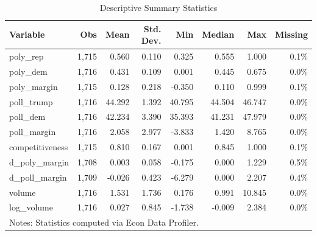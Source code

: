 \begin{table}[htbp]
\centering
\caption{Descriptive Summary Statistics}
\label{tab:summary_stats}
\begin{tabular}{lrrrrrrr}
\hline\hline
Variable & Obs & Mean & Std. Dev. & Min & Median & Max & Missing \\
\hline
poly\_rep & 1,715 & 0.560 & 0.110 & 0.325 & 0.555 & 1.000 & 0.1\% \\
poly\_dem & 1,716 & 0.431 & 0.109 & 0.001 & 0.445 & 0.675 & 0.0\% \\
poly\_margin & 1,715 & 0.128 & 0.218 & -0.350 & 0.110 & 0.999 & 0.1\% \\
poll\_trump & 1,716 & 44.292 & 1.392 & 40.795 & 44.504 & 46.747 & 0.0\% \\
poll\_dem & 1,716 & 42.234 & 3.390 & 35.393 & 41.231 & 47.979 & 0.0\% \\
poll\_margin & 1,716 & 2.058 & 2.977 & -3.833 & 1.420 & 8.765 & 0.0\% \\
competitiveness & 1,715 & 0.810 & 0.167 & 0.001 & 0.845 & 1.000 & 0.1\% \\
d\_poly\_margin & 1,708 & 0.003 & 0.058 & -0.175 & 0.000 & 1.229 & 0.5\% \\
d\_poll\_margin & 1,709 & -0.026 & 0.423 & -6.279 & 0.000 & 2.207 & 0.4\% \\
volume & 1,716 & 1.531 & 1.736 & 0.176 & 0.991 & 10.845 & 0.0\% \\
log\_volume & 1,716 & 0.027 & 0.845 & -1.738 & -0.009 & 2.384 & 0.0\% \\
\hline\hline
\multicolumn{8}{l}{\footnotesize Notes: Statistics computed via Econ Data Profiler.}
\end{tabular}
\end{table}
